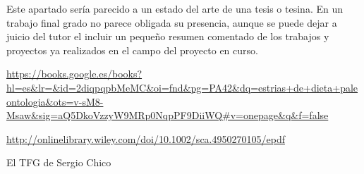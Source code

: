 
Este apartado sería parecido a un estado del arte de una tesis o tesina. En un trabajo final grado no parece obligada su presencia, aunque se puede dejar a juicio del tutor el incluir un pequeño resumen comentado de los trabajos y proyectos ya realizados en el campo del proyecto en curso. 


\url{https://books.google.es/books?hl=es&lr=&id=2diqpqpbMeMC&oi=fnd&pg=PA42&dq=estrias+de+dieta+paleontologia&ots=v-sM8-Msaw&sig=aQ5DkoVzzyW9MRp0NqpPF9DiiWQ#v=onepage&q&f=false}


\url{http://onlinelibrary.wiley.com/doi/10.1002/sca.4950270105/epdf}

El TFG de Sergio Chico